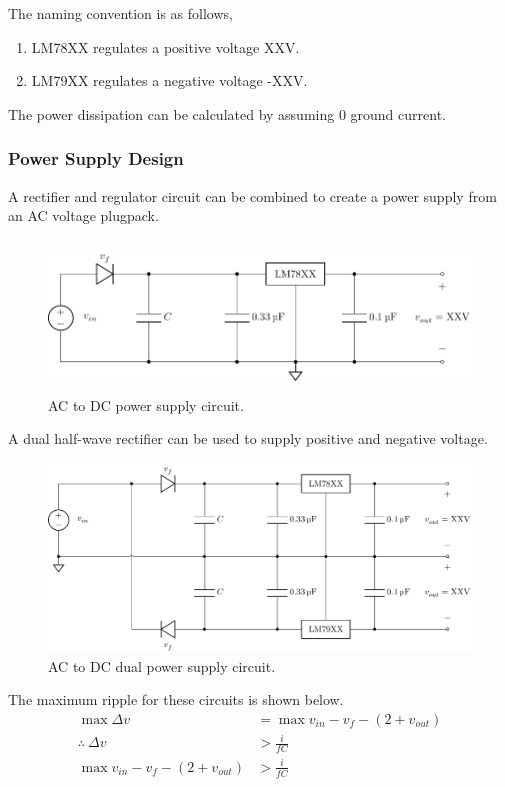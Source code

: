 \documentclass{article}
\begin{document}
The naming convention is as follows,
\begin{enumerate}
    \item LM78XX regulates a positive voltage XX\unit{\volt}.
    \item LM79XX regulates a negative voltage -XX\unit{\volt}.
\end{enumerate}
The power dissipation can be calculated by assuming 0 ground current.
\subsubsection{Power Supply Design}
A rectifier and regulator circuit can be combined to create a power supply from an AC voltage plugpack.
\begin{figure}[H]
    \centering
    \includegraphics[height = 4cm, keepaspectratio = true]{figures/power_supply.pdf}
    \caption{AC to DC power supply circuit.}
\end{figure}
A dual half-wave rectifier can be used to supply positive and negative voltage.
\begin{figure}[H]
    \centering
    \includegraphics[width = \linewidth, keepaspectratio = true]{figures/dual_power_supply.pdf}
    \caption{AC to DC dual power supply circuit.}
\end{figure}
The maximum ripple for these circuits is shown below.
\begin{align*}
    \max{\Delta v}                                  & = \max{v_{in}} - v_f - \left( 2 + v_{out} \right) \\
    \therefore\: \Delta v                           & > \frac{i}{fC}                                    \\
    \max{v_{in}} - v_f - \left( 2 + v_{out} \right) & > \frac{i}{fC}
\end{align*}
\end{document}
